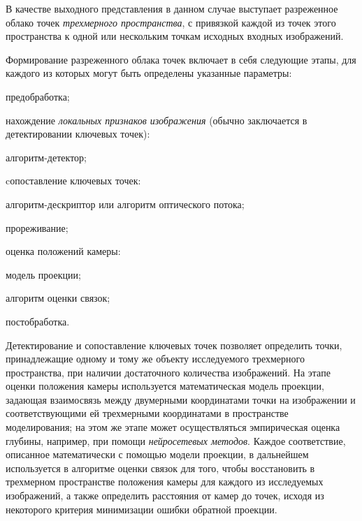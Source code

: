 В качестве выходного представления в данном случае выступает разреженное облако точек \textit{трехмерного пространства}, с привязкой каждой из точек этого пространства к одной или нескольким точкам исходных входных изображений.

Формирование разреженного облака точек включает в себя следующие этапы, для каждого из которых могут быть определены указанные параметры:
\begin{textitemize}
    \item предобработка;
    \item нахождение \textit{локальных признаков изображения} (обычно заключается в детектировании ключевых точек):
    \begin{textitemize}
        \item алгоритм-детектор;
    \end{textitemize}
    \item cопоставление ключевых точек:
    \begin{textitemize}
        \item алгоритм-дескриптор или алгоритм оптического потока;
        \item прореживание;
    \end{textitemize}
    \item оценка положений камеры:
    \begin{textitemize}
        \item модель проекции;
        \item алгоритм оценки связок;
    \end{textitemize}
    \item постобработка.
\end{textitemize}

Детектирование и сопоставление ключевых точек позволяет определить точки, принадлежащие одному и тому же объекту исследуемого трехмерного пространства, при наличии достаточного количества изображений. На этапе оценки положения камеры используется математическая модель проекции, задающая взаимосвязь между двумерными координатами точки на изображении и соответствующими ей трехмерными координатами в пространстве моделирования; на этом же этапе может осуществляться эмпирическая оценка глубины, например, при помощи \textit{нейросетевых методов}. Каждое соответствие, описанное математически с помощью модели проекции, в дальнейшем используется в алгоритме оценки связок для того, чтобы восстановить в трехмерном пространстве положения камеры для каждого из исследуемых изображений, а также определить расстояния от камер до точек, исходя из некоторого критерия минимизации ошибки обратной проекции.

